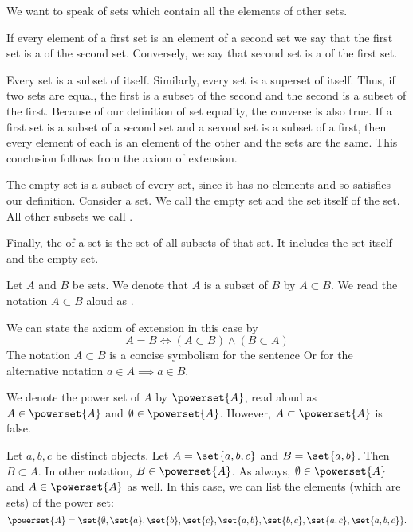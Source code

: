 
\sbasic





\sstart
{}


We want to speak
of sets which contain
all the elements of
other sets.


If every element
of a first set is
an element of a
second set we say
that the first set
is a 
of the second set.
Conversely, we say that
second set is a
 of
the first set.

Every set is a subset of itself.
Similarly, every set is a
superset of itself.
Thus, if two sets are equal,
the first is a subset of the
second and the second is
a subset of the first.
Because of our definition
of set equality, the converse
is also true.
If a first set is a subset
of a second set and a second
set is a subset of a first,
then every element of each
is an element of the other
and the sets are the same.
This conclusion follows from
the axiom of extension.

The empty set is a subset of every set,
since it has no elements and so satisfies
our definition.
Consider a set.
We call the empty set and the set itself
of the set.
All other subsets we call
.


Finally, the 
of a set is the set of all subsets of that
set.
It includes the set itself and the empty set.

Let $A$ and $B$ be sets.
We denote that $A$ is a subset of $B$ by $A \subset B$.
We read the notation $A \subset B$ aloud as .

We can state the axiom of extension
in this case by
\[
  A = B \Leftrightarrow (A \subset B) \land (B \subset A)
\]
The notation $A \subset B$
is a concise symbolism for
the sentence
 Or for the alternative notation
$a \in A \implies a \in B$.


We denote the power set of $A$ by $\powerset{A}$, read aloud as 
$A \in \powerset{A}$ and $\emptyset \in \powerset{A}$.
However, $A \subset \powerset{A}$ is false.


Let $a, b, c$ be distinct
objects. Let $A = \set{a, b ,c}$
and $B = \set{a, b}$. Then
$B \subset A$.
In other notation,
$B \in \powerset{A}$.
As always, $\emptyset \in \powerset{A}$
and $A \in \powerset{A}$ as well.
In this case, we can
list the elements (which are sets)
of the power set:
\[
  \powerset{A} = \set{
    \emptyset,
    \set{a},
    \set{b},
    \set{c},
    \set{a, b},
    \set{b, c},
    \set{a, c},
    \set{a, b, c}
  }.
\]
\strats
